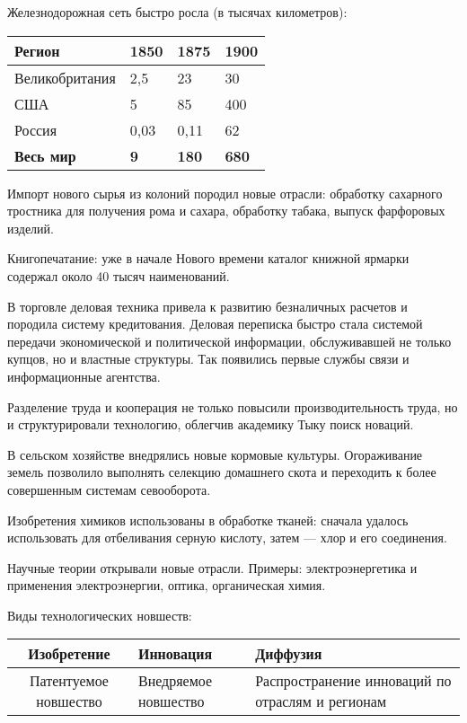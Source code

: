Железнодорожная сеть быстро росла (в тысячах километров):


\bigskip

\begin{center}
\tablefirsthead{}
\tablehead{}
\tabletail{}
\tablelasttail{}
\begin{supertabular}{|m{1.1538599in}|m{0.37685984in}|m{0.37685984in}|m{0.38375986in}|}
\hline
\bfseries Регион &
\bfseries 1850 &
\bfseries 1875 &
\bfseries 1900\\\hline
 Великобритания &
 2,5 &
 23 &
 30\\\hline
 США &
 5 &
 85 &
 400\\\hline
 Россия &
 0,03 &
 0,11 &
 62\\\hline
\bfseries Весь мир &
\bfseries 9 &
\bfseries 180 &
\bfseries 680\\\hline
\end{supertabular}
\end{center}

Импорт нового сырья из колоний породил новые отрасли: обработку сахарного тростника для получения рома и сахара,
обработку табака, выпуск фарфоровых изделий.


Книгопечатание: уже в начале Нового времени каталог книжной ярмарки содержал около 40 тысяч наименований.


В торговле деловая техника привела к развитию безналичных расчетов и породила систему кредитования. Деловая переписка
быстро стала системой передачи экономической и политической информации, обслуживавшей не только купцов, но и властные
структуры. Так появились первые службы связи и информационные агентства.


Разделение труда и кооперация не только повысили производительность труда, но и структурировали технологию, облегчив
академику Тыку поиск новаций.


В сельском хозяйстве внедрялись новые кормовые культуры. Огораживание земель позволило выполнять селекцию домашнего
скота и переходить к более совершенным системам севооборота.


Изобретения химиков использованы в обработке тканей: сначала удалось использовать для отбеливания серную кислоту, затем
— хлор и его соединения.


Научные теории открывали новые отрасли. Примеры: электроэнергетика и применения электроэнергии, оптика, органическая
химия.


Виды технологических новшеств:

\begin{flushleft}
\tablefirsthead{}
\tablehead{}
\tabletail{}
\tablelasttail{}
\begin{supertabular}{|cp{3cm}p{4cm}|}\hline
\bfseries Изобретение & \bfseries Инновация & \bfseries Диффузия \\\hline
 Патентуемое новшество &
 Внедряемое новшество &
 Распространение инноваций по отраслям и регионам\\\hline
\end{supertabular}
\end{flushleft}

